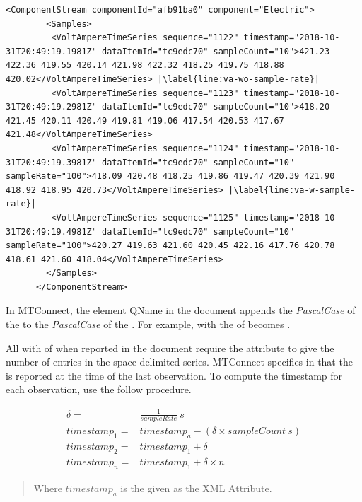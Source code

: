 \begin{lstlisting}[firstnumber=last,escapechar=|,%
    caption={Electric Component Time Series Example},label={lst:electric-timeseries}]
      <ComponentStream componentId="afb91ba0" component="Electric">
        <Samples>
         <VoltAmpereTimeSeries sequence="1122" timestamp="2018-10-31T20:49:19.1981Z" dataItemId="tc9edc70" sampleCount="10">421.23 422.36 419.55 420.14 421.98 422.32 418.25 419.75 418.88 420.02</VoltAmpereTimeSeries> |\label{line:va-wo-sample-rate}|
         <VoltAmpereTimeSeries sequence="1123" timestamp="2018-10-31T20:49:19.2981Z" dataItemId="tc9edc70" sampleCount="10">418.20 421.45 420.11 420.49 419.81 419.06 417.54 420.53 417.67 421.48</VoltAmpereTimeSeries>
         <VoltAmpereTimeSeries sequence="1124" timestamp="2018-10-31T20:49:19.3981Z" dataItemId="tc9edc70" sampleCount="10" sampleRate="100">418.09 420.48 418.25 419.86 419.47 420.39 421.90 418.92 418.95 420.73</VoltAmpereTimeSeries> |\label{line:va-w-sample-rate}|
         <VoltAmpereTimeSeries sequence="1125" timestamp="2018-10-31T20:49:19.4981Z" dataItemId="tc9edc70" sampleCount="10" sampleRate="100">420.27 419.63 421.60 420.45 422.16 417.76 420.78 418.61 421.60 418.04</VoltAmpereTimeSeries>
        </Samples>
      </ComponentStream>
\end{lstlisting}

In MTConnect, the  element QName in the  document appends the \textit{PascalCase} of the  to the \textit{PascalCase} of the . For example,   with the  of  becomes . 

All  with  of  when reported in the  document require the attribute  to give the number of entries in the space delimited series. MTConnect specifies in \cite{MTCPart3} that the  is reported at the time of the last observation. To compute the timestamp for each observation, use the follow procedure.

\begin{align}
  \delta =& \frac{1}{sampleRate}\ s \label{eqn:ts-delta} \\
  timestamp_1 =& timestamp_a - (\delta \times sampleCount\ s) \label{eqn:ts-first} \\
  timestamp_2 =& timestamp_1 + \delta  \label{eqn:ts-second} \\
  timestamp_n =& timestamp_1 + \delta \times n \label{eqn:ts-n}
\end{align}
\begin{quote}
  Where $timestamp_a$ is the  given as the XML Attribute.
\end{quote}


